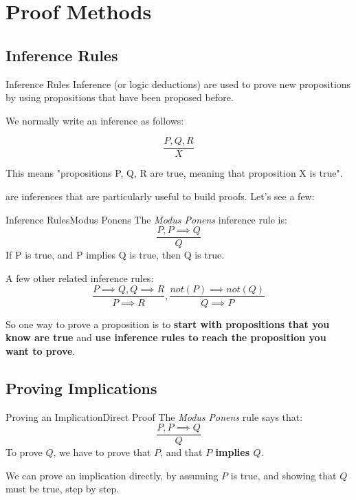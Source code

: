 \section{Proof Methods}


\subsection{Inference Rules}

\begin{frame}{Inference Rules}{}
  Inference (or logic deductions) are used to prove new propositions by using propositions that have been proposed before.
  \bigskip

  We normally write an inference as follows:

  \[
  \frac{P, Q, R}{X}
  \]

  This means "propositions P, Q, R are true, meaning that proposition X is true".\bigskip

   are inferences that are particularly useful to build proofs. Let's see a few:
\end{frame}

\begin{frame}{Inference Rules}{Modus Ponens}
  The \emph{Modus Ponens} inference rule is:
  \[
  \frac{P, P\implies Q}{Q}
  \]
  If P is true, and P implies Q is true, then Q is true.\bigskip

  A few other related inference rules:
  \[
  \frac{P \implies Q, Q \implies R}{P \implies R},
  \frac{not(P) \implies not(Q)}{Q \implies P}
  \]

  So one way to prove a proposition is to {\bf start with propositions that you know are true} and {\bf use inference rules to reach the proposition you want to prove}.
\end{frame}

\subsection{Proving Implications}

\begin{frame}{Proving an Implication}{Direct Proof}
  The \emph{Modus Ponens} rule says that:
  \[
  \frac{P, P\implies Q}{Q}
  \]
  To prove $Q$, we have to prove that $P$, and that {\bf $P$ implies $Q$}.\bigskip

  We can prove an implication directly, by assuming $P$ is true, and showing that $Q$ must be true, step by step.\bigskip
\end{frame}

